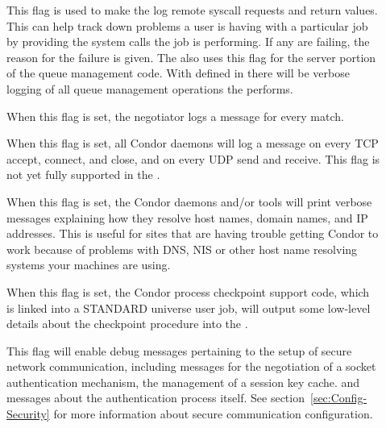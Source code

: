 \begin{description}
\begin{description}
\item[] \label{dflag:syscalls}
  This flag is used to
  make the  log remote syscall requests and return
  values.  This can help track down problems a user is having with a
  particular job by providing the system calls the job is
  performing. If any are failing, the reason for the
  failure is given.  The  also uses this flag for the server
  portion of the queue management code.  With 
  defined in  there will be verbose logging of all
  queue management operations the  performs.  

\item[] \label{dflag:match}
  When this flag is
  set, the negotiator logs a message for every match.

\item[] \label{dflag:network}
  When this flag is set,
  all Condor daemons will log a message on every TCP accept, connect,
  and close, and on every UDP send and receive.  This flag is not
  yet fully supported in the .

\item[] \label{dflag:hostname}
  When this flag is set, the Condor daemons and/or tools will print
  verbose messages explaining how they resolve host names, domain
  names, and IP addresses.
  This is useful for sites that are having trouble getting Condor to
  work because of problems with DNS, NIS or other host name resolving
  systems your machines are using.

\item[] \label{dflag:ckpt}
  When this flag is set,
  the Condor process checkpoint support code, which is linked into a STANDARD 
  universe user job, will output some low-level details about the checkpoint
  procedure into the .

\item[] \label{dflag:security}
  This flag will enable debug messages pertaining to the setup of 
  secure network communication, 
  including messages for the negotiation of a socket 
  authentication mechanism, the management of a session key cache.
  and messages about the authentication process itself.  See
  section~\ref{sec:Config-Security} for more information about
  secure communication configuration.


\end{description}
\end{description}
